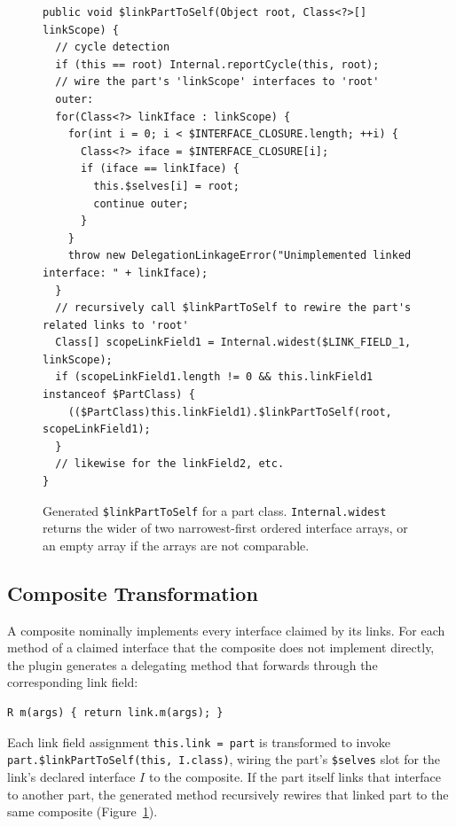 \documentclass[acmsmall,nonacm]{acmart}
\theoremstyle{acmplain}
\newcommand{\code}[1]{\texttt{#1}}
\begin{document}
\begin{figure}[H]
\begin{lstlisting}
public void $linkPartToSelf(Object root, Class<?>[] linkScope) {
  // cycle detection
  if (this == root) Internal.reportCycle(this, root);
  // wire the part's 'linkScope' interfaces to 'root'
  outer:
  for(Class<?> linkIface : linkScope) {
    for(int i = 0; i < $INTERFACE_CLOSURE.length; ++i) {
      Class<?> iface = $INTERFACE_CLOSURE[i];
      if (iface == linkIface) {
        this.$selves[i] = root;
        continue outer;
      }
    }
    throw new DelegationLinkageError("Unimplemented linked interface: " + linkIface);
  }
  // recursively call $linkPartToSelf to rewire the part's related links to 'root'
  Class[] scopeLinkField1 = Internal.widest($LINK_FIELD_1, linkScope);
  if (scopeLinkField1.length != 0 && this.linkField1 instanceof $PartClass) {
    (($PartClass)this.linkField1).$linkPartToSelf(root, scopeLinkField1);
  }
  // likewise for the linkField2, etc.
}
\end{lstlisting}
\caption{Generated \code{\$linkPartToSelf} for a part class. \code{Internal.widest} returns the wider of two narrowest-first
ordered interface arrays, or an empty array if the arrays are not comparable.}
\label{fig:linkPartToSelf-listing}
\end{figure}

\subsection{Composite Transformation}

A composite nominally implements every interface claimed by its links. For each method of a claimed interface that the composite
does not implement directly, the plugin generates a delegating method that forwards through the corresponding link field:

\begin{lstlisting}
R m(args) { return link.m(args); }
\end{lstlisting}

Each link field assignment \code{this.link = part} is transformed to invoke \code{part.\$linkPartToSelf(this, I.class)}, wiring the part's
\code{\$selves} slot for the link's declared interface $I$ to the composite. If the part itself links that interface to another part,
the generated method recursively rewires that linked part to the same composite (Figure~\ref{fig:linkPartToSelf-listing}).
\end{document}
